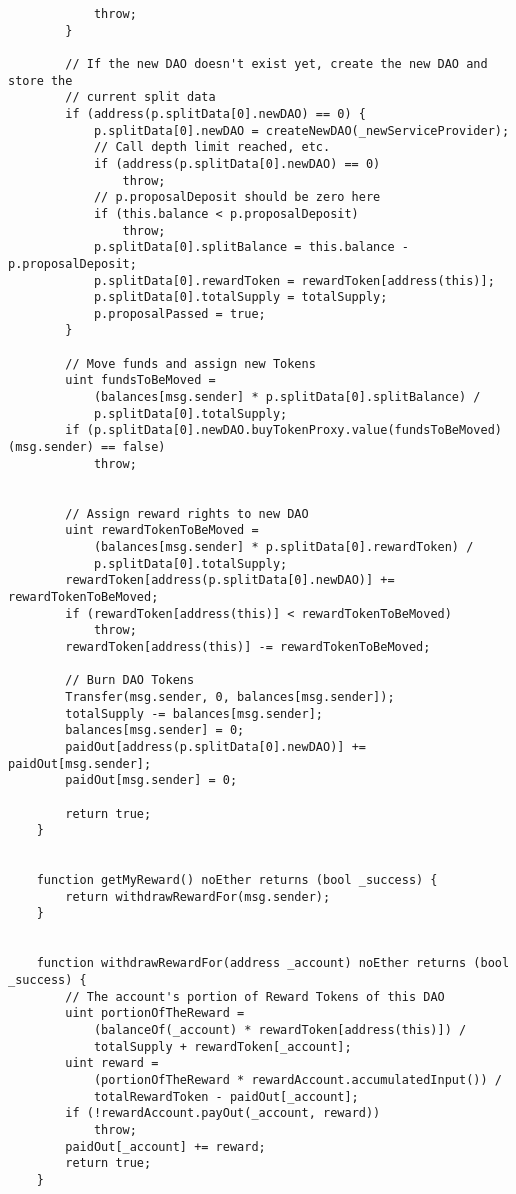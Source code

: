 \documentclass[9pt,oneside]{amsart}
\begin{document}
\begin{appendix}
\begin{verbatim}
            throw;
        }

        // If the new DAO doesn't exist yet, create the new DAO and store the
        // current split data
        if (address(p.splitData[0].newDAO) == 0) {
            p.splitData[0].newDAO = createNewDAO(_newServiceProvider);
            // Call depth limit reached, etc.
            if (address(p.splitData[0].newDAO) == 0)
                throw;
            // p.proposalDeposit should be zero here
            if (this.balance < p.proposalDeposit)
                throw;
            p.splitData[0].splitBalance = this.balance - p.proposalDeposit;
            p.splitData[0].rewardToken = rewardToken[address(this)];
            p.splitData[0].totalSupply = totalSupply;
            p.proposalPassed = true;
        }

        // Move funds and assign new Tokens
        uint fundsToBeMoved =
            (balances[msg.sender] * p.splitData[0].splitBalance) /
            p.splitData[0].totalSupply;
        if (p.splitData[0].newDAO.buyTokenProxy.value(fundsToBeMoved)(msg.sender) == false)
            throw;


        // Assign reward rights to new DAO
        uint rewardTokenToBeMoved =
            (balances[msg.sender] * p.splitData[0].rewardToken) /
            p.splitData[0].totalSupply;
        rewardToken[address(p.splitData[0].newDAO)] += rewardTokenToBeMoved;
        if (rewardToken[address(this)] < rewardTokenToBeMoved)
            throw;
        rewardToken[address(this)] -= rewardTokenToBeMoved;

        // Burn DAO Tokens
        Transfer(msg.sender, 0, balances[msg.sender]);
        totalSupply -= balances[msg.sender];
        balances[msg.sender] = 0;
        paidOut[address(p.splitData[0].newDAO)] += paidOut[msg.sender];
        paidOut[msg.sender] = 0;

        return true;
    }


    function getMyReward() noEther returns (bool _success) {
        return withdrawRewardFor(msg.sender);
    }


    function withdrawRewardFor(address _account) noEther returns (bool _success) {
        // The account's portion of Reward Tokens of this DAO
        uint portionOfTheReward =
            (balanceOf(_account) * rewardToken[address(this)]) /
            totalSupply + rewardToken[_account];
        uint reward =
            (portionOfTheReward * rewardAccount.accumulatedInput()) /
            totalRewardToken - paidOut[_account];
        if (!rewardAccount.payOut(_account, reward))
            throw;
        paidOut[_account] += reward;
        return true;
    }



\end{verbatim}
\end{appendix}
\end{document}
